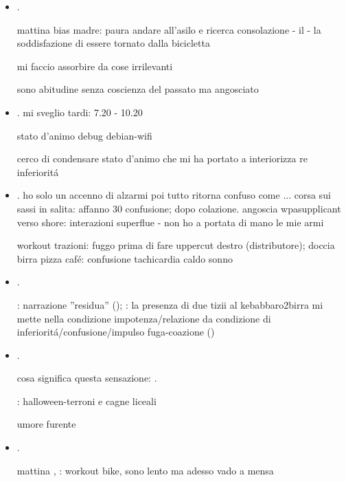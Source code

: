 \begin{itemize}
\item {}.

mattina bias madre: paura andare all'asilo e ricerca consolazione -  il - la soddisfazione di essere tornato dalla bicicletta

mi faccio assorbire da cose irrilevanti

sono abitudine senza coscienza del passato ma angosciato

\item {}.
mi sveglio tardi: 7.20 - 10.20

stato d'animo debug debian-wifi

cerco di condensare stato d'animo che mi ha portato a interiorizza re inferiorit\'a

\item {}.
ho solo un accenno di alzarmi poi tutto ritorna confuso come ...
corsa sui sassi in salita: affanno 30 confusione; dopo colazione.
angoscia wpasupplicant verso shore: interazioni superflue - non ho a portata di mano le mie armi

workout trazioni: fuggo prima di fare uppercut destro (distributore); doccia birra pizza caf\'e: confusione tachicardia caldo sonno

\item {}.

: narrazione ''residua'' (); : la presenza di due tizii al kebabbaro2birra mi mette nella condizione impotenza/relazione da condizione di inferiorit\'a/confusione/impulso fuga-coazione ()

\item {}.

cosa significa questa sensazione: .

: halloween-terroni e cagne liceali

umore furente

\item {}.

mattina , : workout bike, sono lento ma adesso vado a mensa


\end{itemize}
